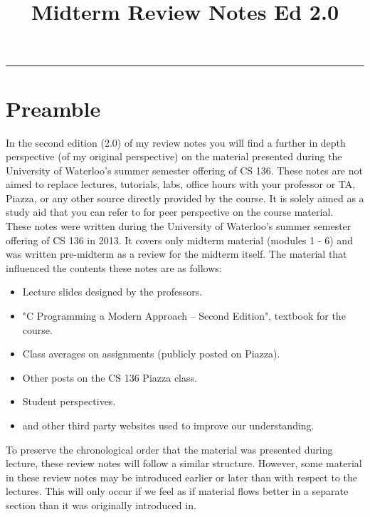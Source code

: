 \documentclass[11pt, twoside, exarticle]{article}
\title{\textbf{Midterm Review Notes Ed 2.0}}
\newcommand{\docbuild}{2.0}
\begin{document}
\thispagestyle{empty}

\makeatletter
\hfil\parbox[t]{0.7\textwidth}{\centering\LARGE\bfseries\@title}\par
\kern0.5cm \hrule\kern0.5cm
\makeatother

\section*{Preamble}

In the second edition (\docbuild) of my review notes you will find a further in depth perspective (of my original perspective) on the material presented during the University of Waterloo's summer semester offering of CS 136. These notes are not aimed to replace lectures, tutorials, labs, office hours with your professor or TA, Piazza, or any other source directly provided by the course. It is solely aimed as a study aid that you can refer to for peer perspective on the course material.\\

These notes were written during the University of Waterloo's summer semester offering of CS 136 in 2013. It covers only midterm material (modules 1 - 6) and was written pre-midterm as a review for the midterm itself. The material that influenced the contents these notes are as follows:

\begin{itemize}

\item Lecture slides designed by the professors.
\item "C Programming a Modern Approach -- Second Edition", textbook for the course.
\item Class averages on assignments (publicly posted on Piazza).
\item Other posts on the CS 136 Piazza class.
\item Student perspectives.
\item and other third party websites used to improve our understanding.

\end{itemize}

To preserve the chronological order that the material was presented during lecture, these review notes will follow a similar structure. However, some material in these review notes may be introduced earlier or later than with respect to the lectures. This will only occur if we feel as if material flows better in a separate section than it was originally introduced in.\\
\end{document}
